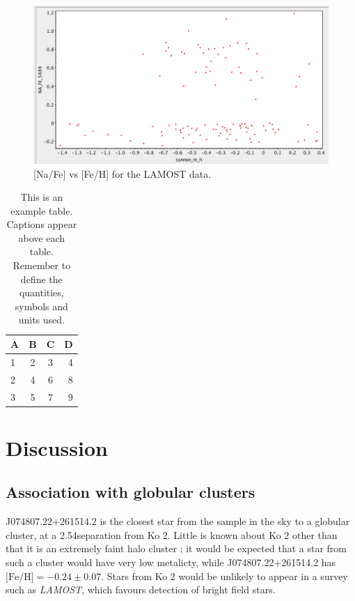 \documentclass[a4paper,fleqn,usenatbib]{mnras}
\newcommand{\project}[1]{\emph{#1}}
\newcommand{\lamost}{\project{LAMOST}}
\begin{document}
\begin{figure}
	\includegraphics[width=\columnwidth]{NavsFe.png}
    \caption{[Na/Fe] vs [Fe/H] for the LAMOST data.}
    \label{NavsFe}
\end{figure}

\begin{table}
	\centering
	\caption{This is an example table. Captions appear above each table.
	Remember to define the quantities, symbols and units used.}
	\label{tab:example_table}
	\begin{tabular}{lccr} %
		\hline
		A & B & C & D\\
		\hline
		1 & 2 & 3 & 4\\
		2 & 4 & 6 & 8\\
		3 & 5 & 7 & 9\\
		\hline
	\end{tabular}
\end{table}

\section{Discussion}
\subsection{Association with globular clusters}
J074807.22+261514.2 is the closest star from the sample in the sky to a globular cluster, at a 2.54\degree separation from Ko 2.
Little is known about Ko 2 other than that it is an extremely faint halo cluster \citep{koposov2007}; it would be expected that a star from such a cluster would have very low metalicty, while J074807.22+261514.2 has $ \text{[Fe/H]} = -0.24 \pm 0.07$. Stars from Ko 2 would be unlikely to appear in a survey such as \lamost, which favours detection of bright field stars.
\end{document}
